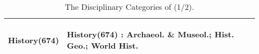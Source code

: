 {\begin{table}[p]
{\begin{tabular}{>{\raggedright\arraybackslash}p{3.5cm}>{\raggedright\arraybackslash}p{17cm}}
\begin{mybox}[colback=brown!60!white, coltext=white, height=0.8cm]{}\textbf{History(674)}\end{mybox} &\begin{minipage}[t]{17cm}
\begin{mybox}[colback=brown!20, coltext=black, height=0.8cm]{}
\textbf{\textcolor{brown!80!black!60}{History(674)}} : Archaeol. \& Museol.; Hist. Geo.; World Hist.\end{mybox}
\end{minipage}\\
\bottomrule
\end{tabular}
}
\caption{The Disciplinary Categories of \benchmark (1/2).}
\label{tab:discipline_1}
\end{table}
}
